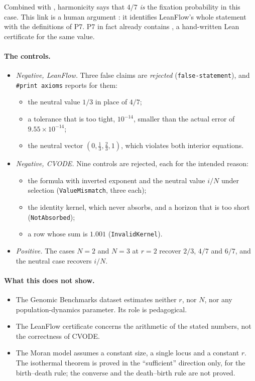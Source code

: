 Combined with , harmonicity says that $4/7$ \emph{is} the fixation probability in this case.
This link is a human argument \tierC{}: it identifies LeanFlow's whole statement with the definitions
 of P7. P7 in fact already contains , a hand-written Lean certificate for the same
value.

\paragraph{The controls.}
\begin{itemize}
\item \emph{Negative, LeanFlow.} Three false claims are \emph{rejected} (\texttt{false-statement}), and
\texttt{\#print axioms} reports  for them:
\begin{itemize}
\item the neutral value $1/3$ in place of $4/7$;
\item a tolerance that is too tight, $10^{-14}$, smaller than the actual error of $9.55\times10^{-14}$;
\item the neutral vector $(0,\tfrac13,\tfrac23,1)$, which violates both interior equations.
\end{itemize}
\item \emph{Negative, CVODE.} Nine controls are rejected, each for the intended reason:
\begin{itemize}
\item the formula with inverted exponent and the neutral value $i/N$ under selection (\texttt{ValueMismatch}, three
each);
\item the identity kernel, which never absorbs, and a horizon that is too short (\texttt{NotAbsorbed});
\item a row whose sum is $1.001$ (\texttt{InvalidKernel}).
\end{itemize}
\item \emph{Positive.} The cases $N=2$ and $N=3$ at $r=2$ recover $2/3$, $4/7$ and $6/7$, and the neutral case recovers $i/N$.
\end{itemize}

\paragraph{What this does not show.}
\begin{itemize}
\item The Genomic Benchmarks dataset estimates neither $r$, nor $N$, nor any population-dynamics parameter. Its role
is pedagogical.
\item The LeanFlow certificate concerns the arithmetic of the stated numbers, not the correctness of CVODE.
\item The Moran model assumes a constant size, a single locus and a constant $r$. The isothermal theorem is
proved in the ``sufficient'' direction only, for the birth--death rule; the converse and the
death--birth rule are not proved.
\end{itemize}

